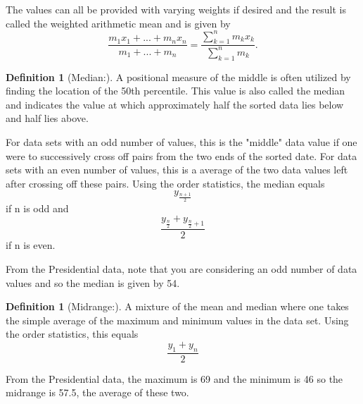 \documentclass[10pt,]{book}
\theoremstyle{plain}
\theoremstyle{definition}
\newtheorem{definition}[theorem]{Definition}
\theoremstyle{definition}
\theoremstyle{definition}
\numberwithin{equation}{section}
\begin{document}
	The values can all be provided with varying weights if desired and the result is called the weighted arithmetic mean and is given by
		\begin{equation*}
		\frac{m_1 x_1 + ... + m_n x_n}{m_1 + ... + m_n} = \frac{\sum_{k=1}^n m_k x_k}{\sum_{k=1}^n m_k}.
		\end{equation*}
\begin{definition}[{Median:}]\label{definition-8}
A positional measure of the middle is often utilized by finding the location of the 50th percentile. This value is also called the median and indicates the value at which approximately half the sorted data lies below and half lies above.%
\end{definition}
\par

For data sets with an odd number of values, this is the "middle" data value if one were to successively cross off pairs from the two ends of the sorted date. For data sets with an even number of values, this is a average of the two data values left after crossing off these pairs.  Using the order statistics, the median equals
	\begin{equation*}y_{\frac{n+1}{2}}\end{equation*}
if n is odd and
	\begin{equation*}\frac{y_\frac{n}{2} + y_{\frac{n}{2}+1}}{2}\end{equation*}
if n is even.
%
\par
From the Presidential data, note that you are considering an odd number of data values and so the median is given by 54. %
\begin{definition}[{Midrange:}]\label{definition-9}
A mixture of the mean and median where one takes the simple average of the maximum and minimum values in the data set. Using the order statistics, this equals 
	\begin{equation*}\frac{y_1+y_n}{2}\end{equation*}
%
\end{definition}
\par
From the Presidential data, the maximum is 69 and the minimum is 46 so the midrange is 57.5, the average of these two. %
\par
\end{document}
